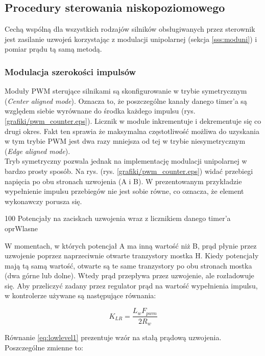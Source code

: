 \subsection{Procedury sterowania niskopoziomowego}
\label{sss:lowlevel}

Cechą wspólną dla wszystkich rodzajów silników obsługiwanych przez sterownik jest zasilanie uzwojeń korzystając z  modulacji unipolarnej (sekcja \ref{sss:moduni}) i pomiar prądu tą samą metodą. 

\subsubsection{Modulacja szerokości impulsów}
\label{sss:pwm_soft}

Moduły PWM sterujące silnikami są skonfigurowanie w trybie symetrycznym ({\it Center aligned mode}). Oznacza to, że poszczególne kanały danego timer'a są względem siebie wyrównane do środka każdego impulsu (rys. \ref{grafiki/pwm_counter.eps}). Licznik w module inkrementuje i dekrementuje się co drugi okres. Fakt ten sprawia że maksymalna częstotliwość możliwa do uzyskania w tym trybie PWM jest dwa razy mniejsza od tej w trybie niesymetrycznym ({\it Edge aligned mode}). \\
	
Tryb symetryczny pozwala jednak na implementację modulacji unipolarnej w bardzo prosty sposób. Na rys. (rys. \ref{grafiki/pwm_counter.eps}) widać przebiegi napięcia po obu stronach uzwojenia (A i B). W prezentowanym przykładzie wypełnienie impulsu przebiegów nie jest sobie równe, co oznacza, że element wykonawczy porusza się. 

	{100}
	{Potencjały na zaciskach uzwojenia wraz z licznikiem danego timer'a}
	{oprWlasne}

W momentach, w których potencjał A ma inną wartość niż B, prąd płynie przez uzwojenie poprzez naprzeciwnie otwarte tranzystory mostka H. Kiedy potencjały mają tą samą wartość, otwarte są te same tranzystory po obu stronach mostka (dwa górne lub dolne). Wtedy prąd przepływa przez uzwojenie, ale rozładowuje się. Aby przeliczyć zadany przez regulator prąd na wartość wypełnienia impulsu, w kontrolerze używane są następujące równania: 

\begin{equation} \label{eq:lowlevel1}
	K_{LR} = \frac{L_w F_{pwm}}{2 R_w}
\end{equation}

Równanie \ref{eq:lowlevel1} prezentuje wzór na stałą prądową uzwojenia. Poszczególne zmienne to:

